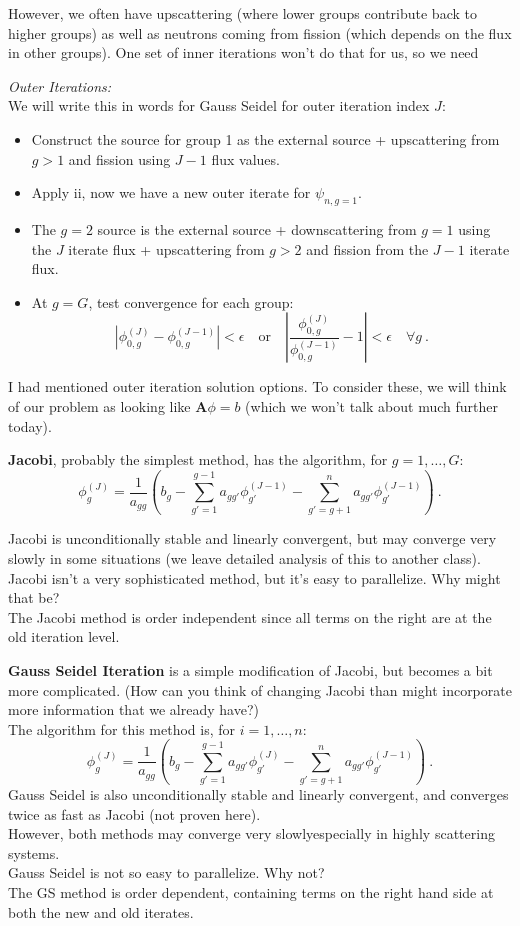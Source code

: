 \documentclass[12pt]{article}
\newcommand{\ve}[1]{\ensuremath{\mathbf{#1}}}
\begin{document}
%
However, we often have upscattering (where lower groups contribute back to higher groups) as well as neutrons coming from fission (which depends on the flux in other groups). One set of inner iterations won't do that for us, so we need 


\textit{Outer Iterations:} \\
We will write this in words for Gauss Seidel for outer iteration index $J$:
%
\begin{itemize}
\item Construct the source for group 1 as the external source + upscattering from $g>1$ and fission using $J-1$ flux values.
\item Apply ii, now we have a new outer iterate for $\psi_{n,g=1}$.
\item The $g=2$ source is the external source + downscattering from $g=1$ using the $J$ iterate flux + upscattering from $g>2$ and fission from the $J-1$ iterate flux. 
\item At $g=G$, test convergence for each group:
\[
|\phi_{0,g}^{(J)} - \phi_{0,g}^{(J-1)}| < \epsilon \quad \text{or} \quad |\frac{\phi_{0,g}^{(J)}}{\phi_{0,g}^{(J-1)}} - 1| < \epsilon \quad \forall g \:.
\]
\end{itemize}
I had mentioned outer iteration solution options. To consider these, we will think of our problem as looking like $\ve{A} \phi = b$ (which we won't talk about much further today).

\textbf{Jacobi}, probably the simplest method, has the algorithm, for $g = 1, \dots, G$:
\[\phi^{(J)}_g = \frac{1}{a_{gg}}(b_g - \sum_{g'=1}^{g-1} a_{gg'} \phi_{g'}^{(J-1)} - \sum_{g'=g+1}^{n} a_{gg'} \phi_{g'}^{(J-1)})\:.\]

Jacobi is unconditionally stable and linearly convergent, but may converge very slowly in some situations (we leave detailed analysis of this to another class). \\
Jacobi isn't a very sophisticated method, but it's easy to parallelize. Why might that be? \\The Jacobi method is order independent since all terms on the right are at the old iteration level. 

\textbf{Gauss Seidel Iteration} is a simple modification of Jacobi, but becomes a bit more complicated. (How can you think of changing Jacobi than might incorporate more information that we already have?)\\
The algorithm for this method is, for $i = 1, \dots, n$:
\[ \phi^{(J)}_g = \frac{1}{a_{gg}}(b_g - \sum_{g'=1}^{g-1} a_{gg'} \phi_{g'}^{(J)} - \sum_{g'=g+1}^{n} a_{gg'} \phi_{g'}^{(J-1)}) \:.\]
%
Gauss Seidel is also unconditionally stable and linearly convergent, and 
converges twice as fast as Jacobi (not proven here). \\
However, both methods may converge very slowly\textemdash especially in highly scattering systems.\\
Gauss Seidel is not so easy to parallelize. Why not? \\The GS method is order dependent, containing terms on the right hand side at both the new and old iterates.
\end{document}
